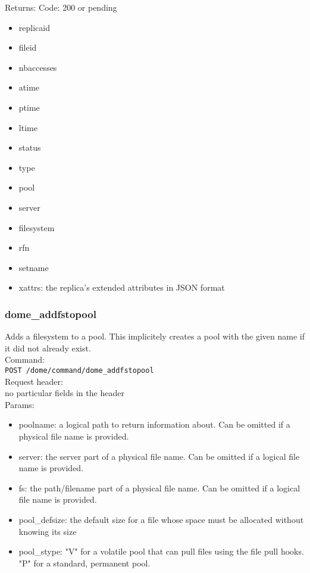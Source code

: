 \documentclass[a4paper,10pt]{scrreprt}
\begin{document}
Returns:
Code: 200 or pending
\begin{itemize}

 \item replicaid
 \item fileid
 \item nbaccesses
 \item atime
 \item ptime
 \item ltime
 \item status
 \item type
 \item pool
 \item server
 \item filesystem
 \item rfn
 \item setname
 \item xattrs: the replica's extended attributes in JSON format
\end{itemize}



\subsubsection{dome\_addfstopool}
Adds a filesystem to a pool. This implicitely creates a pool with the given name if it did not already exist.\\

Command:\\
\lstinline"POST /dome/command/dome_addfstopool"\\

Request header:\\
no particular fields in the header\\

Params:
\begin{itemize}
 \item poolname: a logical path to return information about. Can be omitted if a physical file name is provided.
 \item server: the server part of a physical file name. Can be omitted if a logical file name is provided.
 \item fs: the path/filename part of a physical file name. Can be omitted if a logical file name is provided.
 \item pool\_defsize: the default size for a file whose space must be allocated without knowing its size
 \item pool\_stype: "V" for a volatile pool that can pull files using the file pull hooks. "P" for a standard, permanent pool.
\end{itemize}
\end{document}
